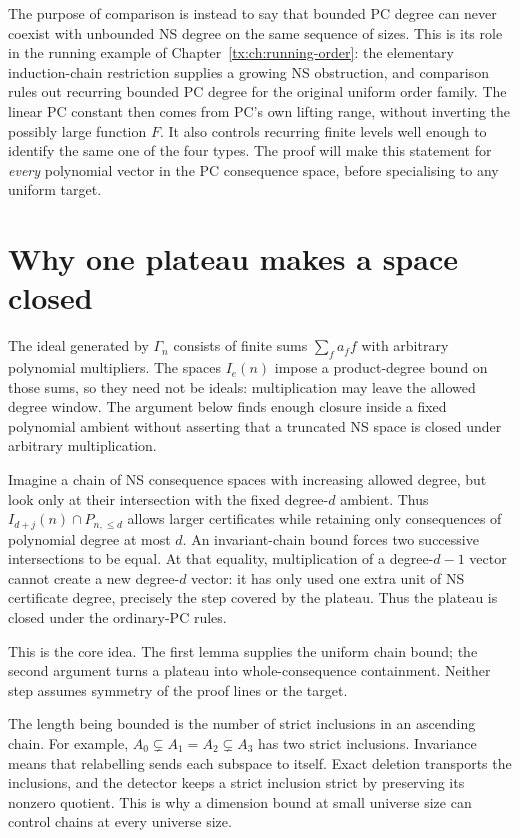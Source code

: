 \documentclass[11pt,a4paper,oneside,openany]{book}
\theoremstyle{definition}\newtheorem{definition}[theorem]{Definition}
\theoremstyle{remark}\newtheorem{remark}[theorem]{Remark}
\numberwithin{equation}{chapter}
\begin{document}
The purpose of comparison is instead to say that bounded PC degree can
never coexist with unbounded NS degree on the same sequence of sizes.
This is its role in the running example of
Chapter~\ref{tx:ch:running-order}: the elementary induction-chain
restriction supplies a growing NS obstruction, and comparison rules
out recurring bounded PC degree for the original uniform order
family. The linear PC constant then comes from PC's own lifting
range, without inverting the possibly large function $F$.
It also controls recurring finite levels well enough to identify the
same one of the four types. The proof will make this statement for
\emph{every} polynomial vector in the PC consequence space, before
specialising to any uniform target.

\section{Why one plateau makes a space closed}
The ideal generated by $\Gamma_n$ consists of finite sums $\sum_f a_ff$
with arbitrary polynomial multipliers. The spaces $I_e(n)$ impose a
product-degree bound on those sums, so they need not be ideals:
multiplication may leave the allowed degree window. The argument below
finds enough closure inside a fixed polynomial ambient without asserting
that a truncated NS space is closed under arbitrary multiplication.

Imagine a chain of NS consequence spaces with increasing allowed degree,
but look only at their intersection with the fixed degree-$d$ ambient.
Thus $I_{d+j}(n)\cap P_{n,\le d}$ allows larger certificates while
retaining only consequences of polynomial degree at most $d$.
An invariant-chain bound forces two successive intersections to be equal.
At that equality, multiplication of a degree-$d-1$ vector cannot create
a new degree-$d$ vector: it has only used one extra unit of NS certificate
degree, precisely the step covered by the plateau. Thus the plateau is
closed under the ordinary-PC rules.

This is the core idea. The first lemma supplies the uniform chain bound;
the second argument turns a plateau into whole-consequence containment.
Neither step assumes symmetry of the proof lines or the target.

The length being bounded is the number of strict inclusions in an
ascending chain. For example, $A_0\subsetneq A_1=A_2\subsetneq A_3$ has two strict
inclusions. Invariance means that relabelling sends each subspace to
itself. Exact deletion transports the inclusions, and the
detector keeps a strict inclusion strict by preserving its nonzero
quotient. This is why a dimension bound at small universe size can control
chains at every universe size.
\end{document}
